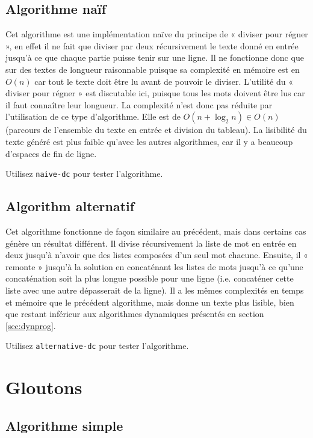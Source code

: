 \documentclass[a4paper, 11pt]{article}
\begin{document}
\subsection{Algorithme naïf}

Cet algorithme est une implémentation naïve du principe de « diviser pour régner
», en effet il ne fait que diviser par deux récursivement le texte donné en
entrée jusqu'à ce que chaque partie puisse tenir sur une ligne. Il ne fonctionne
donc que sur des textes de longueur raisonnable puisque sa complexité en mémoire
est en $O(n)$ car tout le texte doit être lu avant de pouvoir le diviser.
L'utilité du « diviser pour régner » est discutable ici, puisque tous les mots
doivent être lus car il faut connaître leur longueur. La complexité n'est donc
pas réduite par l'utilisation de ce type d'algorithme. Elle est de
$O(n+\log_2 n) \in O(n)$ (parcours de l'ensemble du texte en entrée et division
du tableau). La lisibilité du texte généré est plus faible qu'avec les autres
algorithmes, car il y a beaucoup d'espaces de fin de ligne.

Utilisez \verb|naive-dc| pour tester l'algorithme.

\subsection{Algorithm alternatif}

Cet algorithme fonctionne de façon similaire au précédent, mais dans certains
cas génère un résultat différent. Il divise récursivement la liste de mot en
entrée en deux jusqu'à n'avoir que des listes composées d'un seul mot chacune.
Ensuite, il « remonte » jusqu'à la solution en concaténant les listes de mots
jusqu'à ce qu'une concaténation soit la plus longue possible pour une ligne
(i.e. concaténer cette liste avec une autre dépasserait de la ligne). Il a les
mêmes complexités en temps et mémoire que le précédent algorithme, mais donne un
texte plus lisible, bien que restant inférieur aux algorithmes dynamiques
présentés en section \ref{sec:dynprog}.

Utilisez \verb|alternative-dc| pour tester l'algorithme.

\section{Gloutons}

\subsection{Algorithme simple}
\label{sec:simple-greedy}
\end{document}
